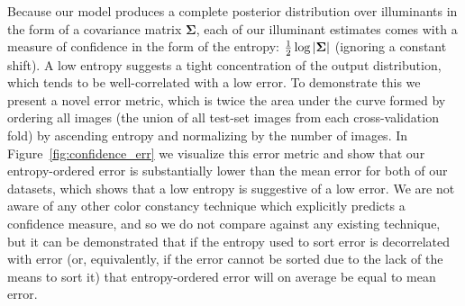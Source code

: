 \documentclass[10pt,twocolumn,letterpaper]{article}
\begin{document}
Because our model produces a complete posterior distribution over illuminants
in the form of a covariance matrix $\boldsymbol{\Sigma}$, each of our
illuminant estimates comes with a measure of confidence in the form
of the entropy: ${1 \over 2} \log{|\boldsymbol{\Sigma}| }$ (ignoring a constant shift).
A low entropy suggests a tight concentration of the output distribution, which
tends to be well-correlated with a low error.
To demonstrate this we present a novel error metric, which is twice the area
under the curve formed by ordering all images
(the union of all test-set images from each cross-validation fold)
by ascending entropy and normalizing by the number of images.
In Figure~\ref{fig:confidence_err} we visualize this error metric and show
that our entropy-ordered error is substantially lower than the mean error
for both of our datasets, which shows that a low entropy is suggestive
of a low error.
We are not aware of any other color constancy technique which explicitly
predicts a confidence measure, and so we do not compare against any
existing technique, but it can be demonstrated that if the entropy used
to sort error is decorrelated with error (or, equivalently, if the error cannot
be sorted due to the lack of the means to sort it)
that entropy-ordered error will on average be equal to mean error.
\end{document}
